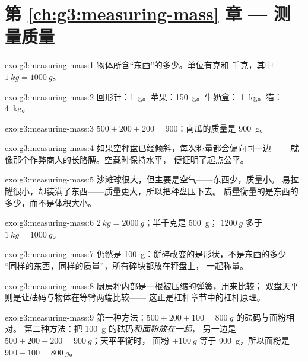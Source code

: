 \section*{第 \ref{ch:g3:measuring-mass} 章 --- 测量质量}

\begin{solution}{exo:g3:measuring-mass:1}
物体所含“东西”的多少。单位有克和
千克，其中 $\qty{1}{kg} = \qty{1000}{g}$。
\end{solution}

\begin{solution}{exo:g3:measuring-mass:2}
回形针：\qty{1}{g}。苹果：\qty{150}{g}。牛奶盒：
\qty{1}{kg}。猫：\qty{4}{kg}。
\end{solution}

\begin{solution}{exo:g3:measuring-mass:3}
$500 + 200 + 200 = 900$：南瓜的质量是 \qty{900}{g}。
\end{solution}

\begin{solution}{exo:g3:measuring-mass:4}
如果空秤盘已经倾斜，每次称量都会偏向同一边——
就像那个作弊商人的长胳膊。空载时保持水平，
便证明了起点公平。
\end{solution}

\begin{solution}{exo:g3:measuring-mass:5}
沙滩球很大，但主要是空气——东西少，质量小。
易拉罐很小，却装满了东西——质量更大，所以把秤盘压下去。
质量衡量的是东西的多少，而不是体积大小。
\end{solution}

\begin{solution}{exo:g3:measuring-mass:6}
$\qty{2}{kg} = \qty{2000}{g}$；半千克是 \qty{500}{g}；
$\qty{1200}{g}$ 多于 $\qty{1}{kg} = \qty{1000}{g}$。
\end{solution}

\begin{solution}{exo:g3:measuring-mass:7}
仍然是 \qty{100}{g}：掰碎改变的是形状，不是东西的多少——
“同样的东西，同样的质量”，所有碎块都放在秤盘上，
一起称量。
\end{solution}

\begin{solution}{exo:g3:measuring-mass:8}
厨房秤内部是一根被压缩的弹簧，用来比较；
双盘天平则是让砝码与物体在等臂两端比较——
这正是杠杆章节中的杠杆原理。
\end{solution}

\begin{solution}{exo:g3:measuring-mass:9}
第一种方法：$500 + 200 + 100 = \qty{800}{g}$ 的砝码与面粉相对。
第二种方法：把 \qty{100}{g} 的砝码\emph{和面粉放在一起}，
另一边是 $500 + 200 + 200 = \qty{900}{g}$；天平平衡时，
面粉 $+ \qty{100}{g}$ 等于 \qty{900}{g}，所以面粉是
$900 - 100 = \qty{800}{g}$。
\end{solution}


